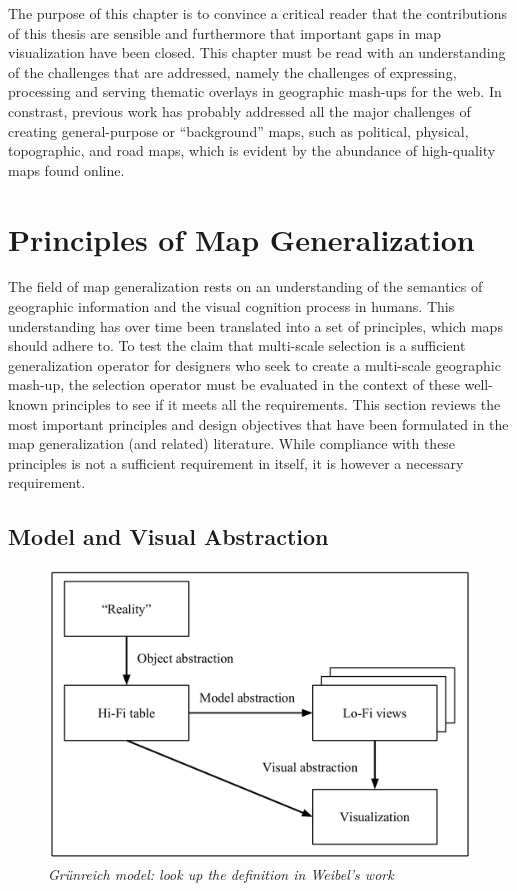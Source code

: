 \documentclass[11pt, oneside]{report}
\begin{document}
The purpose of this chapter is to convince a critical reader that the contributions of this thesis are sensible and furthermore that important gaps in map visualization have been closed. This chapter must be read with an understanding of the challenges that are addressed, namely the challenges of expressing, processing and serving thematic overlays in geographic mash-ups for the web. In constrast, previous work has probably addressed all the major challenges of creating general-purpose or ``background'' maps, such as political, physical, topographic, and road maps, which is evident by the abundance of high-quality maps found online. 

\section{Principles of Map Generalization}

The field of map generalization rests on an understanding of the semantics of geographic information and the visual cognition process in humans. This understanding has over time been translated into a set of principles, which maps should adhere to. To test the claim that multi-scale selection is a sufficient generalization operator for designers who seek to create a multi-scale geographic mash-up, the selection operator must be evaluated in the context of these well-known principles to see if it meets all the requirements. This section reviews the most important principles and design objectives that have been formulated in the map generalization (and related) literature. While compliance with these principles is not a sufficient requirement in itself, it is however a necessary requirement.

\subsection{Model and Visual Abstraction}

\begin{figure}[htbp]
\begin{center}
\includegraphics[scale=.4]{figs-thesis/gruenreich.pdf}
\caption{\emph{Gr{\"u}nreich model: look up the definition in Weibel's work}}
\label{fig:state:of:the:art:gruenreich}
\end{center}
\vspace*{-4ex}
\end{figure}
\end{document}
